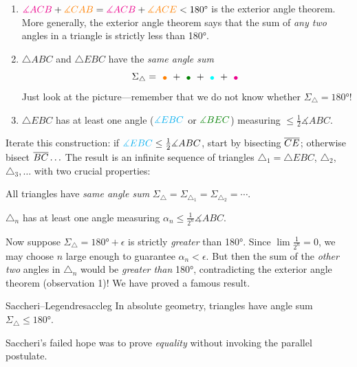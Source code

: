 \begin{enumerate}\itemsep0pt
  \def\lgbullet#1{\raisebox{-3pt}{\textcolor{#1}{\LARGE\textbullet}}}
  \item $\textcolor{magenta}{\measuredangle ACB}+\textcolor{orange}{\measuredangle CAB}=\textcolor{magenta}{\measuredangle ACB}+\textcolor{orange}{\measuredangle ACE}<\ang{180}$ is the exterior angle theorem. More generally, the exterior angle theorem says that the sum of \emph{any two} angles in a triangle is strictly less than \ang{180}.
  \item $\triangle ABC$ and $\triangle EBC$ have the \emph{same angle sum}
  \[
  	\Sigma_\triangle=\lgbullet{orange}+\lgbullet{Green} +\lgbullet{Cyan} +\lgbullet{magenta}
  \]
  Just look at the picture---remember that we do not know whether $\Sigma_\triangle=\ang{180}$!
  \item $\triangle EBC$ has at least one angle ($\textcolor{cyan}{\measuredangle EBC}$ or $\textcolor{Green}{\measuredangle BEC}$) measuring $\le\frac 12\measuredangle ABC$.
\end{enumerate}
Iterate this construction: if $\textcolor{cyan}{\measuredangle EBC}\le\frac 12\measuredangle ABC$, start by bisecting $\cl{CE}$; otherwise bisect $\cl{BC}\ldots$ The result is an infinite sequence of triangles $\triangle_1=\triangle EBC$, $\triangle_2$, $\triangle_3,\ldots$ with two crucial properties:
\begin{enumeratea}
  \item All triangles have \emph{same angle sum} $\Sigma_\triangle=\Sigma_{\triangle_1}=\Sigma_{\triangle_2}=\cdots$.
  \item $\triangle_n$ has at least one angle measuring $\alpha_n\le\frac 1{2^n}\measuredangle ABC$.
\end{enumeratea} 
Now suppose $\Sigma_\triangle=\ang{180}+\epsilon$ is strictly \emph{greater} than \ang{180}. Since $\lim\frac 1{2^n}=0$, we may choose $n$ large enough to guarantee $\alpha_n<\epsilon$. But then the sum of the \emph{other two} angles in $\triangle_n$ would be \emph{greater than} \ang{180}, contradicting the exterior angle theorem (observation 1)! We have proved a famous result.

\begin{thm}{Saccheri--Legendre}{saccleg}
	In absolute geometry, triangles have angle sum $\Sigma_\triangle\le \ang{180}$.
\end{thm}

Saccheri's failed hope was to prove \emph{equality} without invoking the parallel postulate. 



